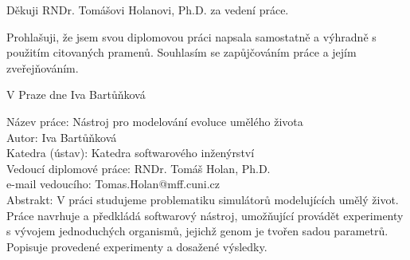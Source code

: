 \documentclass[a4paper,12pt]{report}
\begin{document}

Děkuji RNDr. Tomášovi Holanovi, Ph.D. za vedení práce.

\vspace{\fill} %
\noindent Prohlašuji, že jsem svou diplomovou práci napsala samostatně a výhradně s použitím citovaných pramenů. Souhlasím se zapůjčováním práce a jejím zveřejňováním.

\bigskip
\noindent V Praze dne \hspace{\fill}Iva Bartů\v{n}kov\'{a}\\ %


\tableofcontents %



\newpage %

\newpage %

\noindent
Název práce: N\'{a}stroj pro modelov\'{a}n\'{i} evoluce um\v{e}l\'{e}ho \v{z}ivota\\
Autor: Iva Bartů\v{n}kov\'{a}\\
Katedra (ústav): Katedra softwarov\'{e}ho in\v{z}en\'{y}rstv\'{i}\\
Vedoucí diplomové práce: RNDr. Tom\'{a}\v{s} Holan, Ph.D.\\
e-mail vedoucího: Tomas.Holan@mff.cuni.cz\\

\noindent Abstrakt: V práci studujeme problematiku simulátorů modelujících umělý život. Práce navrhuje a předkládá softwarový nástroj, umožňující provádět experimenty s vývojem jednoduchých organismů, jejichž genom je tvořen sadou parametrů. Popisuje provedené experimenty a dosažené výsledky.


\end{document}
